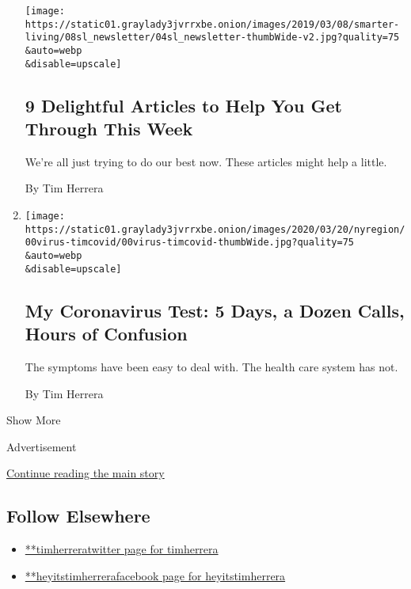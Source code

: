 \begin{enumerate}
  \texttt{[image: https://static01.graylady3jvrrxbe.onion/images/2019/03/08/smarter-living/08sl\_newsletter/04sl\_newsletter-thumbWide-v2.jpg?quality=75\\\&auto=webp\\\&disable=upscale]}

  \hypertarget{9-delightful-articles-to-help-you-get-through-this-week}{%
  \subsection{9 Delightful Articles to Help You Get Through This
  Week}\label{9-delightful-articles-to-help-you-get-through-this-week}}

  We're all just trying to do our best now. These articles might help a
  little.

  By Tim Herrera
\item
  \href{/2020/03/18/nyregion/coronavirus-testing-positive.html}{}

  \texttt{[image: https://static01.graylady3jvrrxbe.onion/images/2020/03/20/nyregion/00virus-timcovid/00virus-timcovid-thumbWide.jpg?quality=75\\\&auto=webp\\\&disable=upscale]}

  \hypertarget{my-coronavirus-test-5-days-a-dozen-calls-hours-of-confusion}{%
  \subsection{My Coronavirus Test: 5 Days, a Dozen Calls, Hours of
  Confusion}\label{my-coronavirus-test-5-days-a-dozen-calls-hours-of-confusion}}

  The symptoms have been easy to deal with. The health care system has
  not.

  By Tim Herrera
\end{enumerate}

Show More

Advertisement

\protect\hyperlink{after-mid2}{Continue reading the main story}

\hypertarget{follow-elsewhere}{%
\subsection{Follow Elsewhere}\label{follow-elsewhere}}

\begin{itemize}
\tightlist
\item
  \href{https://twitter.com/timherrera}{**timherreratwitter page for
  timherrera}
\item
  \href{https://www.facebookcorewwwi.onion/heyitstimherrera}{**heyitstimherrerafacebook
  page for heyitstimherrera}
\end{itemize}

